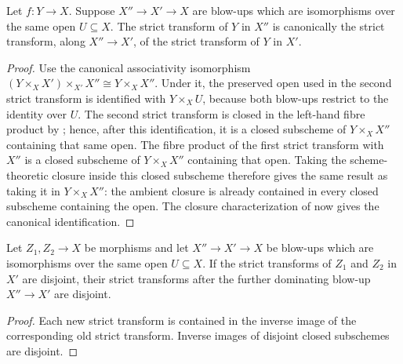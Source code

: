 \begin{lemma}
  \label{lemma:nagata-strict-transform-dominating}

  Let $f\colon Y\to X$.  Suppose $X''\to X'\to X$ are blow-ups which are
  isomorphisms over the same open $U\subseteq X$.  The strict transform of
  $Y$ in $X''$ is canonically the strict
  transform, along $X''\to X'$, of the strict transform of $Y$ in $X'$.
\end{lemma}

\begin{proof}
  Use the canonical associativity isomorphism
  $(Y\times_XX')\times_{X'}X''\cong Y\times_XX''$.  Under it, the preserved
  open used in the second strict transform is identified with
  $Y\times_XU$, because both blow-ups restrict to the identity over $U$.
  The second strict transform is closed in the left-hand fibre product by
  ; hence, after this
  identification, it is a closed subscheme of $Y\times_XX''$ containing that
  same open.  The fibre product of the first strict transform with $X''$ is a
  closed subscheme of $Y\times_XX''$ containing that open.  Taking the
  scheme-theoretic closure inside this closed subscheme therefore gives the
  same result as taking it in $Y\times_XX''$: the ambient closure is already
  contained in every closed subscheme containing the open.  The closure
  characterization of
   now gives the
  canonical identification.
\end{proof}

\begin{lemma}
  \label{lemma:nagata-strict-transform-disjoint-dominating}

  Let $Z_1,Z_2\to X$ be morphisms and let $X''\to X'\to X$ be blow-ups
  which are isomorphisms over the same open $U\subseteq X$.  If the strict
  transforms of $Z_1$ and $Z_2$ in $X'$ are disjoint, their strict transforms
  after the further dominating blow-up $X''\to X'$ are disjoint.
\end{lemma}

\begin{proof}
  Each new strict transform is contained in the inverse image of the
  corresponding old strict transform.  Inverse images of disjoint closed
  subschemes are disjoint.
\end{proof}

